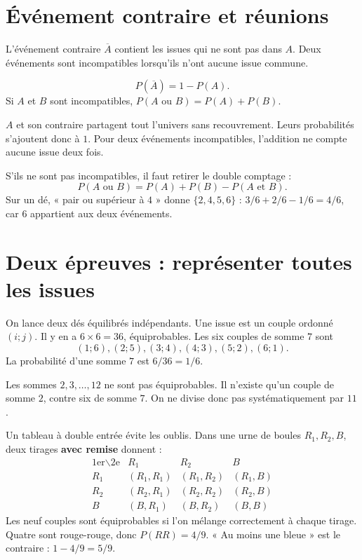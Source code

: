 \documentclass[../cours_3e.tex]{subfiles}
\begin{document}
\section{Événement contraire et réunions}
\begin{definition}
L'événement contraire $\overline A$ contient les issues qui ne sont pas dans $A$. Deux événements sont incompatibles lorsqu'ils n'ont aucune issue commune.
\end{definition}
\begin{propriete}
\[P(\overline A)=1-P(A).\]
Si $A$ et $B$ sont incompatibles, $P(A\text{ ou }B)=P(A)+P(B)$.
\end{propriete}
\begin{demonstration}
$A$ et son contraire partagent tout l'univers sans recouvrement. Leurs probabilités s'ajoutent donc à $1$. Pour deux événements incompatibles, l'addition ne compte aucune issue deux fois.
\end{demonstration}
\approfondissement S'ils ne sont pas incompatibles, il faut retirer le double comptage :
\[P(A\text{ ou }B)=P(A)+P(B)-P(A\text{ et }B).\]
Sur un dé, « pair ou supérieur à $4$ » donne $\{2,4,5,6\}$ : $3/6+2/6-1/6=4/6$, car $6$ appartient aux deux événements.
\section{Deux épreuves : représenter toutes les issues}
\begin{exemple}
On lance deux dés équilibrés indépendants. Une issue est un couple ordonné $(i;j)$. Il y en a $6\times6=36$, équiprobables. Les six couples de somme $7$ sont
\[(1;6),(2;5),(3;4),(4;3),(5;2),(6;1).\]
La probabilité d'une somme $7$ est $6/36=1/6$.
\end{exemple}
\begin{attention}
Les sommes $2,3,\ldots,12$ ne sont pas équiprobables. Il n'existe qu'un couple de somme $2$, contre six de somme $7$. On ne divise donc pas systématiquement par $11$.
\end{attention}
Un tableau à double entrée évite les oublis. Dans une urne de boules $R_1,R_2,B$, deux tirages \textbf{avec remise} donnent :
\[
\begin{array}{c|ccc}
\text{1er}\backslash\text{2e}&R_1&R_2&B\\\hline
R_1&(R_1,R_1)&(R_1,R_2)&(R_1,B)\\
R_2&(R_2,R_1)&(R_2,R_2)&(R_2,B)\\
B&(B,R_1)&(B,R_2)&(B,B)
\end{array}
\]
Les neuf couples sont équiprobables si l'on mélange correctement à chaque tirage. Quatre sont rouge-rouge, donc $P(RR)=4/9$. « Au moins une bleue » est le contraire : $1-4/9=5/9$.
\end{document}
